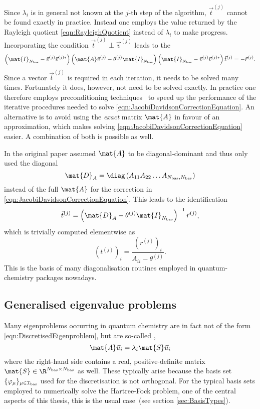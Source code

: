 Since $\lambda_i$ is in general not known at the $j$-th step of the algorithm,
$\vec{t}^{(j)}$ cannot be found exactly in practice.
Instead one employs the value returned by the Rayleigh quotient
\eqref{eqn:RayleighQuotient}
instead of $\lambda_i$ to make progress.
Incorporating the condition $\vec{t}^{(j)} \perp \vec{v}^{(j)}$ leads to the
\begin{equation}
	\left(\mat{I}_{\Nbas} - \vec{v}^{(j)} \vec{v}^{(j)\ast} \right)
	\left(\mat{A} \vec{v}^{(j)} - \theta^{(j)} \mat{I}_{\Nbas}\right)
	\left(\mat{I}_{\Nbas} - \vec{v}^{(j)} \vec{v}^{(j)\ast}\right)
	\vec{t}^{(j)}
	= - \vec{r}^{(j)}.
	\label{eqn:JacobiDavidsonCorrectionEquation}
\end{equation}
Since a vector $\vec{t}^{(j)}$ is required
in each iteration, it needs to be solved many times.
Fortunately it does, however, not need to be solved exactly.
In practice one therefore
employs preconditioning techniques~\cite{Saad2003,Saad2011,Arbenz2010,Grossmann1992}
to speed up the performance of the iterative procedures
needed to solve \eqref{eqn:JacobiDavidsonCorrectionEquation}.
An alternative is to avoid using the \emph{exact} matrix $\mat{A}$
in favour of an approximation,
which makes solving \eqref{eqn:JacobiDavidsonCorrectionEquation} easier.
A combination of both is possible as well.

In the original paper \citet{Davidson1975}
assumed $\mat{A}$ to be diagonal-dominant
and thus only used the diagonal
\[ \mat{D}_A = \diag\left( A_{11} A_{22} \ldots A_{\Nbas,\Nbas} \right) \]
instead of the full $\mat{A}$
for the correction in \eqref{eqn:JacobiDavidsonCorrectionEquation}.
This leads to the identification
\[
	\vec{t}^{(j)} = \left( \mat{D}_A - \theta^{(j)} \mat{I}_{\Nbas} \right)^{-1} \vec{r}^{(j)},
\]
which is trivially computed elementwise as
\[
	\left(t^{(j)}\right)_i = \frac{\left(r^{(j)}\right)_i}{A_{ii} - \theta^{(j)}}.
\]
This is the basis of many diagonalisation routines
employed in quantum-chemistry packages nowadays.

\subsection{Generalised eigenvalue problems}
\label{sec:GeneralisedEigenvalueProblem}
Many eigenproblems occurring in quantum chemistry are in fact
not of the form \eqref{eqn:DiscretisedEigenproblem},
but are so-called ,
\begin{equation}
	\mat{A} \vec{u}_i = \lambda_i \mat{S} \vec{u}_i
	\label{eqn:GeneralisedEigenproblem}
\end{equation}
where the right-hand side contains a
real, positive-definite matrix $\mat{S} \in \R^{\Nbas\times\Nbas}$ as well.
These typically arise because the
basis set $\{\varphi_\mu\}_{\mu \in \mathcal{I}_\text{bas}}$
used for the discretisation is not orthogonal.
For the typical basis sets employed to numerically solve the Hartree-Fock
problem,
one of the central aspects of this thesis,
this is the usual case~(see section \vref{sec:BasisTypes}).

